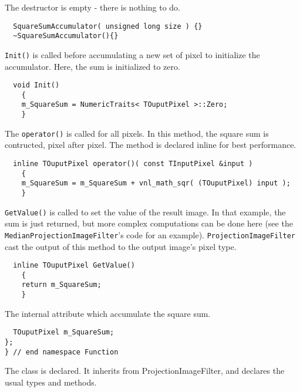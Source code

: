 \documentclass{InsightArticle}
\begin{document}
The destructor is empty - there is nothing to do.
\small \begin{verbatim}
  SquareSumAccumulator( unsigned long size ) {}
  ~SquareSumAccumulator(){}
\end{verbatim} \normalsize
\verb$Init()$ is called before accumulating a new set of pixel
to initialize the accumulator. Here, the sum is initialized to zero.
\small \begin{verbatim}
  void Init()
    {
    m_SquareSum = NumericTraits< TOuputPixel >::Zero;
    }
\end{verbatim} \normalsize
The \verb$operator()$ is called for all pixels. In this method, the square sum is
contructed, pixel after pixel. The method is declared inline for best
performance.
\small \begin{verbatim}
  inline TOuputPixel operator()( const TInputPixel &input )
    {
    m_SquareSum = m_SquareSum + vnl_math_sqr( (TOuputPixel) input );
    }
\end{verbatim} \normalsize
\verb$GetValue()$ is called to set the value of the result image. In that example, the
sum is just returned, but more complex computations can be done here (see the
\verb$MedianProjectionImageFilter$'s code for an example). \verb$ProjectionImageFilter$ cast the
output of this method to the output image's pixel type.
\small \begin{verbatim}
  inline TOuputPixel GetValue()
    {
    return m_SquareSum;
    }
\end{verbatim} \normalsize
The internal attribute which accumulate the square sum.
\small \begin{verbatim}
  TOuputPixel m_SquareSum;
};
} // end namespace Function
\end{verbatim} \normalsize
The class is declared. It inherits from ProjectionImageFilter, and declares the
usual types and methods.
\end{document}
